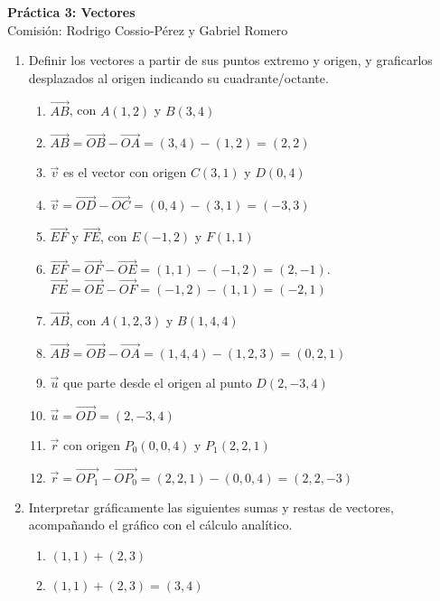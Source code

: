 \documentclass[a4paper]{article}
\newcommand{\answer}{\item[**]}
\newcommand{\exercise}{\item}
\newcommand{\vect}[1]{\overrightarrow{#1}}
\begin{document}
\noindent \hrulefill 
\vspace{-7pt}
\begin{center} 
	\textbf{ Práctica 3: Vectores } \\
	Comisión: Rodrigo Cossio-Pérez y Gabriel Romero
\end{center}
\vspace{-10pt}
\hrulefill


\begin{enumerate}

	\exercise Definir los vectores a partir de sus puntos extremo y origen, y graficarlos desplazados al origen indicando su cuadrante/octante.
	\begin{multicols}{2}
	\begin{enumerate} [label=(\alph*)]
		
		\item $\vect{AB}$, con $A(1,2)$ y $B(3,4)$
		\answer $\vect{AB}= \vect{OB} - \vect{OA} = (3,4) - (1,2) = (2,2)$

		\item $\vec{v}$ es el vector con origen $C(3,1)$ y $D(0,4)$
		\answer $\vec{v}= \vect{OD} - \vect{OC} = (0,4) - (3,1)= (-3,3)$

		\item $\vect{EF}$ y $\vect{FE}$, con $E(-1,2)$ y $F(1,1)$
		\answer $\vect{EF} = \vect{OF} - \vect{OE} = (1,1) - (-1,2) = (2,-1)$. $\vect{FE} = \vect{OE} - \vect{OF} = (-1,2) - (1,1) = (-2,1)$

		\item $\vect{AB}$, con $A(1,2,3)$ y $B(1,4,4)$
		\answer $\vect{AB} = \vect{OB} - \vect{OA} = (1,4,4) - (1,2,3) = (0,2,1)$

		\item $\vec{u}$ que parte desde el origen al punto $D(2,-3,4)$
		\answer $\vec{u} = \vect{OD} = (2,-3,4)$

		\item $\vec{r}$ con origen $P_0(0,0,4)$ y $P_1(2,2,1)$
		\answer $\vec{r} = \vect{OP_1} - \vect{OP_0} = (2,2,1) - (0,0,4) = (2,2,-3)$
 
	\end{enumerate}
	\end{multicols}

	\exercise Interpretar gráficamente las siguientes sumas y restas de vectores, acompañando el gráfico con el cálculo analítico.
	\begin{multicols}{2}
	\begin{enumerate} [label=(\alph*)]
		
		\item $(1,1)+(2,3)$
		\answer $(1,1)+(2,3) = (3,4)$


\end{enumerate}
\end{multicols}
\end{enumerate}
\end{document}
